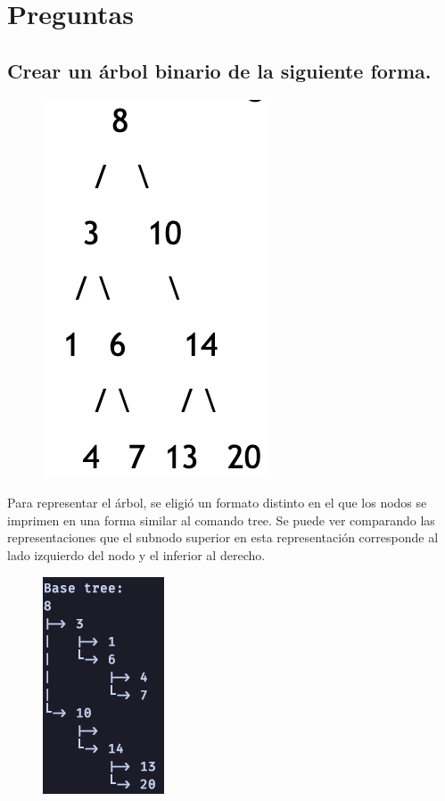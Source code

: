 \documentclass[a4paper,notitlepage]{article}
\begin{document}
\pagebreak

\section{Preguntas}
\subsection{Crear un árbol binario de la siguiente forma.}
\begin{figure}[H]
    \centering
    \includegraphics[scale=0.65]{imgs/base-tree.png}
\end{figure}

Para representar el árbol, se eligió un formato distinto en el que los nodos
se imprimen en una forma similar al comando tree. Se puede ver comparando las
representaciones que el subnodo superior en esta representación corresponde
al lado izquierdo del nodo y el inferior al derecho.

\begin{figure}[H]
    \centering
    \includegraphics[scale=0.65]{imgs/base-tree-run.png}
\end{figure}
\end{document}
